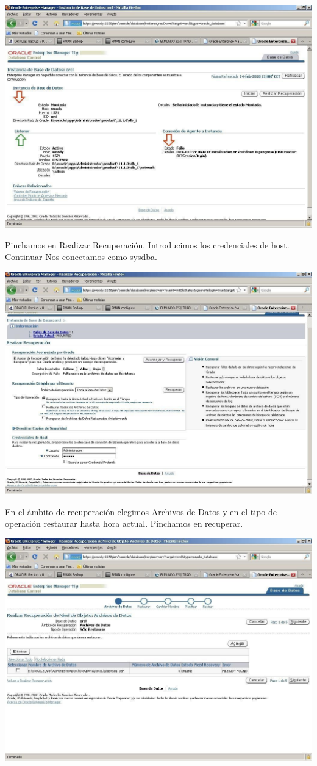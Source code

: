 \documentclass[12pt,letterpaper]{article}
\begin{document}
{\includegraphics[width=14cm]{./IMG/img41.jpg}

Pinchamos en Realizar Recuperación. Introducimos los credenciales de host. Continuar Nos conectamos como sysdba.

\newpage
\includegraphics[width=14cm]{./IMG/img42.jpg}

En el ámbito de recuperación elegimos Archivos de Datos y en el tipo de operación restaurar hasta hora actual. Pinchamos en recuperar.

\newpage
\includegraphics[width=14cm]{./IMG/img43.jpg}

}
\end{document}
